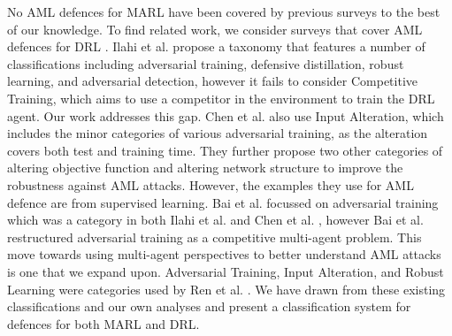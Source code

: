 \documentclass[conference,compsoc]{IEEEtran}
\begin{document}


No AML defences for MARL have been covered by previous surveys to the best of our knowledge. To find related work, we consider surveys that cover AML defences for DRL \cite{ilahi_challenges_2021, chen_adversarial_2019, bai_recent_2021, ren_adversarial_2020}. Ilahi et al. \cite{ilahi_challenges_2021} propose a taxonomy that features a number of classifications including adversarial training, defensive distillation, robust learning, and adversarial detection, however it fails to consider Competitive Training, which aims to use a competitor in the environment to train the DRL agent. Our work addresses this gap. Chen et al. \cite{chen_adversarial_2019} also use Input Alteration, which includes the minor categories of various adversarial training, as the alteration covers both test and training time. They further propose two other categories of altering objective function and altering network structure to improve the robustness against AML attacks. However, the examples they use for AML defence are from supervised learning. Bai et al. \cite{bai_recent_2021} focussed on adversarial training which was a category in both Ilahi et al. \cite{ilahi_challenges_2021} and Chen et al. \cite{chen_adversarial_2019}, however Bai et al. restructured adversarial training as a competitive multi-agent problem. This move towards using multi-agent perspectives to better understand AML attacks is one that we expand upon. Adversarial Training, Input Alteration, and Robust Learning were categories used by Ren et al. \cite{ren_adversarial_2020}. We have drawn from these existing classifications and our own analyses and present a classification system for defences for both MARL and DRL.

\end{document}
